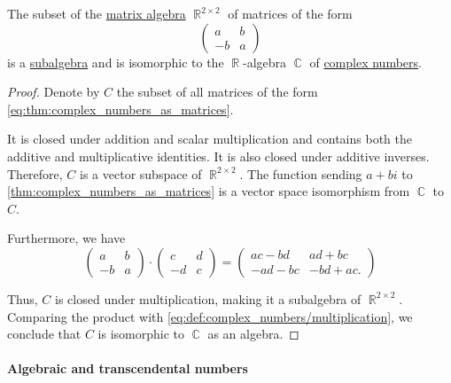 \begin{proposition}\label{thm:complex_numbers_as_matrices}
  The subset of the \hyperref[thm:matrix_algebra]{matrix algebra} \( \BbbR^{2 \times 2} \) of matrices of the form
  \begin{equation}\label{eq:thm:complex_numbers_as_matrices}
    \begin{pmatrix}
      a  & b \\
      -b & a
    \end{pmatrix}
  \end{equation}
  is a \hyperref[def:algebra_over_ring/submodel]{subalgebra} and is isomorphic to the \( \BbbR \)-algebra \( \BbbC \) of \hyperref[def:complex_numbers]{complex numbers}.
\end{proposition}
\begin{proof}
  Denote by \( C \) the subset of all matrices of the form \eqref{eq:thm:complex_numbers_as_matrices}.

  It is closed under addition and scalar multiplication and contains both the additive and multiplicative identities. It is also closed under additive inverses. Therefore, \( C \) is a vector subspace of \( \BbbR^{2 \times 2} \). The function sending \( a + bi \) to \eqref{thm:complex_numbers_as_matrices} is a vector space isomorphism from \( \BbbC \) to \( C \).

  Furthermore, we have
  \begin{equation*}
    \begin{pmatrix}
      a  & b \\
      -b & a
    \end{pmatrix}
    \cdot
    \begin{pmatrix}
      c  & d \\
      -d & c
    \end{pmatrix}
    =
    \begin{pmatrix}
      ac - bd  & ad + bc \\
      -ad - bc & -bd + ac.
    \end{pmatrix}
  \end{equation*}

  Thus, \( C \) is closed under multiplication, making it a subalgebra of \( \BbbR^{2 \times 2} \). Comparing the product with \eqref{eq:def:complex_numbers/multiplication}, we conclude that \( C \) is isomorphic to \( \BbbC \) as an algebra.
\end{proof}

\paragraph{Algebraic and transcendental numbers}

